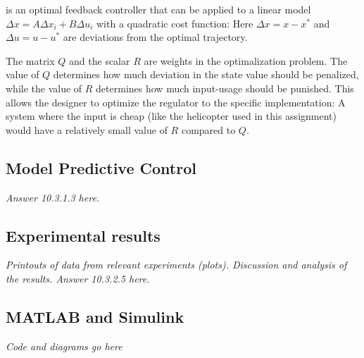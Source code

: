 \documentclass[../main.tex]{subfiles}
\begin{document}
is an optimal feedback controller that can be applied to a linear model $\Delta x=A\Delta x_i + B \Delta u_i$ with a quadratic cost function:
Here $ \Delta x = x - x^*$ and $\Delta u = u - u^*$ are deviations from the optimal trajectory.

The matrix $Q$ and the scalar $R$ are weights in the optimalization problem. The value of $Q$ determines how much deviation in the state value should be penalized, while the value of $R$ determines how much input-usage should be punished. This allows the designer to optimize the regulator to the specific implementation: A system where the input is cheap (like the helicopter used in this assignment) would have a relatively small value of $R$ compared to $Q$.

\subsection{Model Predictive Control}
\textit{Answer 10.3.1.3 here.}

\subsection{Experimental results}
\textit{Printouts of data from relevant experiments (plots).
Discussion and analysis of the results.
Answer 10.3.2.5 here.}

\subsection{MATLAB and Simulink}
\textit{Code and diagrams go here}
\end{document}
